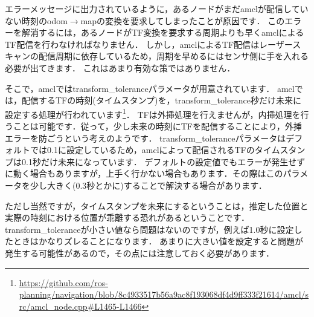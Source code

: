 \documentclass[{../../master}]{subfiles}
\begin{document}
エラーメッセージに出力されているように，あるノードがまだ\textsf{amcl}が配信していない時刻の\textsf{odom}$\rightarrow$\textsf{map}の変換を要求してしまったことが原因です．
このエラーを解消するには，あるノードがTF変換を要求する周期よりも早く\textsf{amcl}によるTF配信を行わなければなりません．
しかし，\textsf{amcl}によるTF配信はレーザースキャンの配信周期に依存しているため，周期を早めるにはセンサ側に手を入れる必要が出てきます．
これはあまり有効な策ではありません．

そこで，\textsf{amcl}では\textsf{transform\_tolerance}パラメータが用意されています．
\textsf{amcl}では，配信するTFの時刻(タイムスタンプ)を，\textsf{transform\_tolerance}秒だけ未来に設定する処理が行われています\footnote{\url{https://github.com/ros-planning/navigation/blob/8c4933517b56a9ac8f193068df4d9ff333f21614/amcl/src/amcl_node.cpp\#L1465-L1466}}．
TFは外挿処理を行えませんが，内挿処理を行うことは可能です．従って，少し未来の時刻にTFを配信することにより，外挿エラーを防ごうという考えのようです．
\textsf{transform\_tolerance}パラメータはデフォルトでは0.1に設定しているため，\textsf{amcl}によって配信されるTFのタイムスタンプは0.1秒だけ未来になっています．
デフォルトの設定値でもエラーが発生せずに動く場合もありますが，上手く行かない場合もあります．その際はこのパラメータを少し大きく(0.3秒とかに)することで解決する場合があります．

ただし当然ですが，タイムスタンプを未来にするということは，推定した位置と実際の時刻における位置が乖離する恐れがあるということです．
\textsf{transform\_tolerance}が小さい値なら問題はないのですが，例えば1.0秒に設定したときはかなりズレることになります．
あまりに大きい値を設定すると問題が発生する可能性があるので，その点には注意しておく必要があります．
\end{document}
